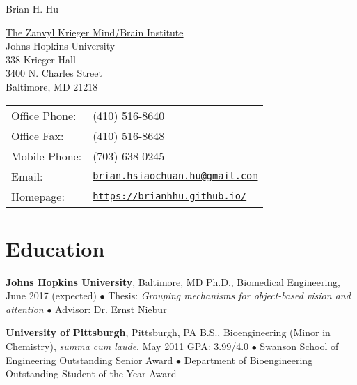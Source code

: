 \documentclass[10pt,letterpaper]{article}
\def\name{Brian H. Hu}
\renewenvironment{itemize}{
  \begin{list}{}{
    \setlength{\leftmargin}{1.5em}
    \setlength{\itemsep}{0.25em}
    \setlength{\parskip}{0pt}
    \setlength{\parsep}{0.25em}
  }
}{
  \end{list}
}
\begin{document}
{\huge \name}


\vspace{0.25in}

\begin{minipage}{0.475\linewidth}
  \href{http://krieger.jhu.edu/mbi/}{The Zanvyl Krieger Mind/Brain Institute} \\
  Johns Hopkins University \\
  338 Krieger Hall \\
  3400 N. Charles Street \\
  Baltimore, MD 21218
\end{minipage}
\begin{minipage}{0.52\linewidth}
  \begin{tabular}{ll}
    Office Phone: & (410) 516-8640 \\
    Office Fax: &  (410) 516-8648 \\
    Mobile Phone: & (703) 638-0245 \\
    Email: & \href{mailto:brian.hsiaochuan.hu@gmail.com}{\tt brian.hsiaochuan.hu@gmail.com} \\
    Homepage: & \href{https://brianhhu.github.io/}{\tt https://brianhhu.github.io/} \\
  \end{tabular}
\end{minipage}

\section*{Education}
\vspace{-0.05in}
\begin{itemize}
  \item \textbf{Johns Hopkins University}, Baltimore, MD
  \subitem Ph.D., Biomedical Engineering, June 2017 (expected)
  \subitem$\bullet$ Thesis: \textit{Grouping mechanisms for object-based vision and attention}
  \subitem$\bullet$ Advisor: Dr. Ernst Niebur
  
  \item \textbf{University of Pittsburgh}, Pittsburgh, PA
  \subitem B.S., Bioengineering (Minor in Chemistry), \textit{summa cum laude}, May 2011
  \subitem GPA: 3.99/4.0
  \vspace{0.05in}
  \subitem$\bullet$ Swanson School of Engineering Outstanding Senior Award
  \subitem$\bullet$ Department of Bioengineering Outstanding Student of the Year Award
\end{itemize}
\end{document}
